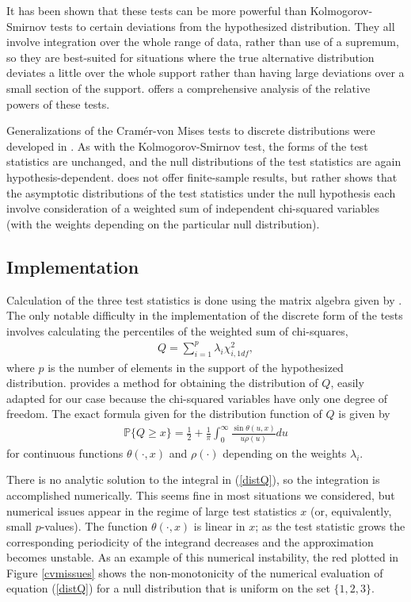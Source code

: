 It has been shown that these tests can be more powerful than 
Kolmogorov-Smirnov tests to certain deviations from the hypothesized distribution. 
They all involve integration over the whole range of data, rather than
use of a supremum, so they are best-suited for situations where the
true alternative distribution deviates a little over the whole support
rather than having large deviations over a small section of the support. 
\cite{stephens1974} offers a comprehensive analysis of the relative powers
of these tests.


Generalizations of the Cram\'{e}r-von Mises tests to discrete
distributions were developed in \cite{choulakian1994}. As with the
Kolmogorov-Smirnov test, the forms of the test statistics are unchanged, 
and the null distributions of the test statistics are again hypothesis-dependent. \cite{choulakian1994} does not offer finite-sample results, but rather 
shows that the asymptotic distributions of the test statistics under the null hypothesis each involve consideration of a weighted sum of independent
chi-squared variables (with the weights depending on the particular
null distribution). 


\subsection{Implementation}

Calculation of the three test statistics is done using the
matrix algebra given by \cite{choulakian1994}. 
The only notable difficulty in the implementation of the discrete form
of the tests involves calculating the percentiles
of the weighted sum of chi-squares,
\begin{align}
Q = \sum_{i=1}^{p} \lambda_i \chi^2_{i,1df},   \label{eqQ}
\end{align}
where $p$ is the number of elements in the support of the hypothesized
distribution.
\cite{imhof1961} provides a method for obtaining the distribution of $Q$,
easily adapted for our case because
the chi-squared variables have only one degree of freedom.
The exact formula given for the distribution function of $Q$
is given by
\begin{align}
\mathbb{P}\{Q \geq x \} = \frac{1}{2} + 
\frac{1}{\pi} \int_{0}^{\infty} \frac{\sin\theta(u,x)}{u \rho(u) } du
\label{distQ}
\end{align}
for continuous functions $\theta(\cdot, x)$ and $\rho(\cdot)$ depending on the  weights $\lambda_i$. 

There is no analytic solution to the integral in (\ref{distQ}), 
so the integration is
accomplished numerically. This seems fine in most situations we considered,
but numerical issues appear in the regime of large test statistics $x$
(or, equivalently, small $p$-values).
The function $\theta(\cdot, x)$ is linear in $x$; as the test statistic 
grows the corresponding periodicity of the integrand decreases and
the approximation becomes unstable. 
As an example of this numerical instability, the red plotted in
Figure \ref{cvmissues} shows the non-monotonicity of the numerical
evaluation of equation (\ref{distQ}) for a null distribution that is
uniform on the set $\{1,2,3\}$.


